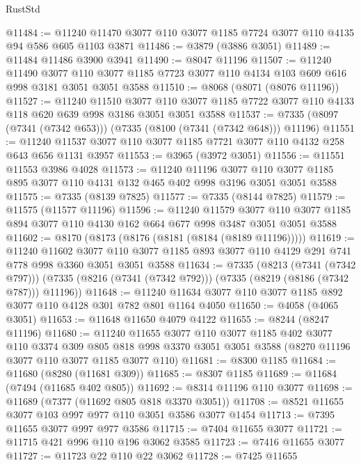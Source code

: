 \begin{lexlean}{RustStd}
\begin{coremodule}
@11484 := @11240 @11470 @3077 @110 @3077 @1185 @7724 @3077 @110 @4135 @94 @586 @605 @1103 @3871
@11486 := @3879 (@3886 @3051)
@11489 := @11484 @11486 @3900 @3941
@11490 := @8047 @11196
@11507 := @11240
    @11490
    @3077
    @110
    @3077
    @1185
    @7723
    @3077
    @110
    @4134
    @103
    @609
    @616
    @998
    @3181
    @3051
    @3051
    @3588
@11510 := @8068 (@8071 (@8076 @11196))
@11527 := @11240
    @11510
    @3077
    @110
    @3077
    @1185
    @7722
    @3077
    @110
    @4133
    @118
    @620
    @639
    @998
    @3186
    @3051
    @3051
    @3588
@11537 := @7335 (@8097 (@7341 (@7342 @653))) (@7335 (@8100 (@7341 (@7342 @648))) @11196)
@11551 := @11240 @11537 @3077 @110 @3077 @1185 @7721 @3077 @110 @4132 @258 @643 @656 @1131 @3957
@11553 := @3965 (@3972 @3051)
@11556 := @11551 @11553 @3986 @4028
@11573 := @11240
    @11196
    @3077
    @110
    @3077
    @1185
    @895
    @3077
    @110
    @4131
    @132
    @465
    @402
    @998
    @3196
    @3051
    @3051
    @3588
@11575 := @7335 (@8139 @7825)
@11577 := @7335 (@8144 @7825)
@11579 := @11575 (@11577 @11196)
@11596 := @11240
    @11579
    @3077
    @110
    @3077
    @1185
    @894
    @3077
    @110
    @4130
    @162
    @664
    @677
    @998
    @3487
    @3051
    @3051
    @3588
@11602 := @8170 (@8173 (@8176 (@8181 (@8184 (@8189 @11196)))))
@11619 := @11240
    @11602
    @3077
    @110
    @3077
    @1185
    @893
    @3077
    @110
    @4129
    @291
    @741
    @778
    @998
    @3360
    @3051
    @3051
    @3588
@11634 := @7335
    (@8213 (@7341 (@7342 @797)))
    (@7335 (@8216 (@7341 (@7342 @792))) (@7335 (@8219 (@8186 (@7342 @787))) @11196))
@11648 := @11240 @11634 @3077 @110 @3077 @1185 @892 @3077 @110 @4128 @301 @782 @801 @1164 @4050
@11650 := @4058 (@4065 @3051)
@11653 := @11648 @11650 @4079 @4122
@11655 := @8244 (@8247 @11196)
@11680 := @11240
    @11655
    @3077
    @110
    @3077
    @1185
    @402
    @3077
    @110
    @3374
    @309
    @805
    @818
    @998
    @3370
    @3051
    @3051
    @3588
    (@8270 @11196 @3077 @110 @3077 @1185 @3077 @110)
@11681 := @8300 @1185
@11684 := @11680 (@8280 (@11681 @309))
@11685 := @8307 @1185
@11689 := @11684 (@7494 (@11685 @402 @805))
@11692 := @8314 @11196 @110 @3077
@11698 := @11689 (@7377 (@11692 @805 @818 @3370 @3051))
@11708 := @8521 @11655 @3077 @103 @997 @977 @110 @3051 @3586 @3077 @1454
@11713 := @7395 @11655 @3077 @997 @977 @3586
@11715 := @7404 @11655 @3077
@11721 := @11715 @421 @996 @110 @196 @3062 @3585
@11723 := @7416 @11655 @3077
@11727 := @11723 @22 @110 @22 @3062
@11728 := @7425 @11655

\end{coremodule}
\end{lexlean}
